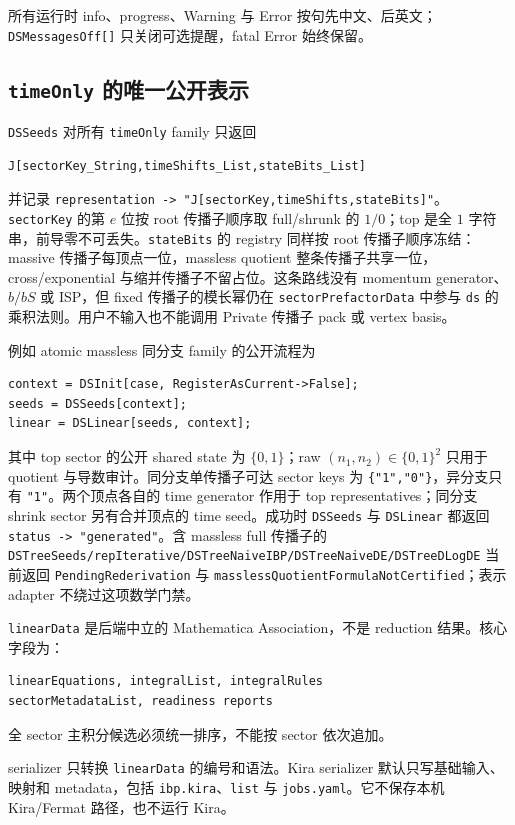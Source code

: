 ﻿\documentclass[a4paper,11pt]{article}
\begin{document}
所有运行时 info、progress、Warning 与 Error 按句先中文、后英文；
\texttt{DSMessagesOff[]} 只关闭可选提醒，fatal Error 始终保留。

\subsection{\texttt{timeOnly} 的唯一公开表示}
\label{sec:timeOnlyRepresentations}

\texttt{DSSeeds} 对所有 \texttt{timeOnly} family 只返回
\begin{verbatim}
J[sectorKey_String,timeShifts_List,stateBits_List]
\end{verbatim}
并记录 \texttt{representation -> "J[sectorKey,timeShifts,stateBits]"}。\texttt{sectorKey} 的第 $e$ 位按 root 传播子顺序取 full/shrunk 的 $1/0$；top 是全 $1$ 字符串，前导零不可丢失。\texttt{stateBits} 的 registry 同样按 root 传播子顺序冻结：massive 传播子每顶点一位，massless quotient 整条传播子共享一位，cross/exponential 与缩并传播子不留占位。这条路线没有 momentum generator、$b/bS$ 或 ISP，但 fixed 传播子的模长幂仍在 \texttt{sectorPrefactorData} 中参与 \texttt{ds} 的乘积法则。用户不输入也不能调用 Private 传播子 pack 或 vertex basis。

例如 atomic massless 同分支 family 的公开流程为
\begin{verbatim}
context = DSInit[case, RegisterAsCurrent->False];
seeds = DSSeeds[context];
linear = DSLinear[seeds, context];
\end{verbatim}
其中 top sector 的公开 shared state 为 $\{0,1\}$；raw $(n_1,n_2)\in\{0,1\}^2$ 只用于 quotient 与导数审计。同分支单传播子可达 sector keys 为 \texttt{\{"1","0"\}}，异分支只有 \texttt{"1"}。两个顶点各自的 time generator 作用于 top representatives；同分支 shrink sector 另有合并顶点的 time seed。成功时 \texttt{DSSeeds} 与 \texttt{DSLinear} 都返回 \texttt{status -> "generated"}。含 massless full 传播子的 \texttt{DSTreeSeeds/repIterative/DSTreeNaiveIBP/DSTreeNaiveDE/DSTreeDLogDE} 当前返回 \texttt{PendingRederivation} 与 \texttt{masslessQuotientFormulaNotCertified}；表示 adapter 不绕过这项数学门禁。

\texttt{linearData} 是后端中立的 Mathematica Association，不是 reduction 结果。核心字段为：
\begin{verbatim}
linearEquations, integralList, integralRules
sectorMetadataList, readiness reports
\end{verbatim}
全 sector 主积分候选必须统一排序，不能按 sector 依次追加。

serializer 只转换 \texttt{linearData} 的编号和语法。Kira serializer 默认只写基础输入、映射和 metadata，包括 \texttt{ibp.kira}、\texttt{list} 与 \texttt{jobs.yaml}。它不保存本机 Kira/Fermat 路径，也不运行 Kira。
\end{document}
